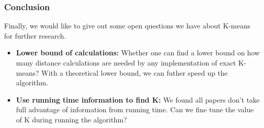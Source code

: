 \documentclass[9pt]{beamer}
\begin{document}
\begin{frame}
	\frametitle{Conclusion}
	Finally, we would like to give out some open questions we have about K-means for further research.
	\begin{itemize}
	\item \textbf{Lower bound of calculations:} Whether one can find a lower bound on how many distance calculations are needed by any implementation of exact K-means? With a theoretical lower bound, we can futher speed up the algorithm.
	\item \textbf{Use running time information to find K:} We found all papers don't take full advantage of information from running time. Can we fine tune the value of K during running the algorithm?
	\end{itemize}
\end{frame}
\end{document}

